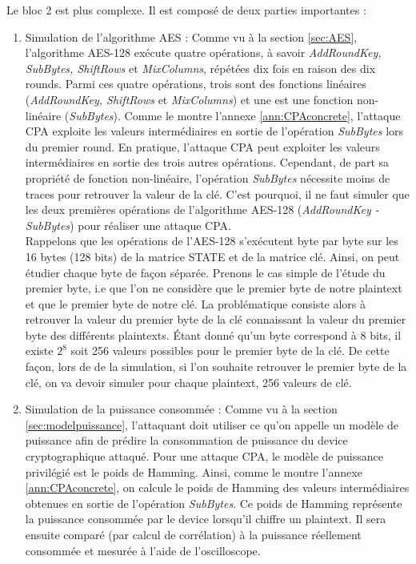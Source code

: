 \documentclass[oneside]{book}
\begin{document}
\hspace{-0.5 cm}Le bloc 2 est plus complexe. Il est composé de deux parties importantes :
\begin{enumerate}
\item Simulation de l'algorithme AES : Comme vu à la section \ref{sec:AES}, l'algorithme AES-128 exécute quatre opérations, à savoir \textit{AddRoundKey, SubBytes, ShiftRows} et \textit{MixColumns}, répétées dix fois en raison des dix rounds. Parmi ces quatre opérations, trois sont des fonctions linéaires (\textit{AddRoundKey, ShiftRows} et \textit{MixColumns}) et une est une fonction non-linéaire (\textit{SubBytes}). Comme le montre l'annexe \ref{ann:CPAconcrete}, l'attaque CPA exploite les valeurs intermédiaires en sortie de l'opération \textit{SubBytes} lors du premier round. En pratique, l'attaque CPA peut exploiter les valeurs intermédiaires en sortie des trois autres opérations. Cependant, de part sa propriété de fonction non-linéaire, l'opération \textit{SubBytes} nécessite moins de traces pour retrouver la valeur de la clé. C'est pourquoi, il ne faut simuler que les deux premières opérations de l'algorithme AES-128 (\textit{AddRoundKey - SubBytes}) pour réaliser une attaque CPA. \\Rappelons que les opérations de l'AES-128 s'exécutent byte par byte sur les 16 bytes (128 bits) de la matrice STATE et de la matrice clé. Ainsi, on peut étudier chaque byte de façon séparée. Prenons le cas simple de l'étude du premier byte, i.e que l'on ne considère que le premier byte de notre plaintext et que le premier byte de notre clé. La problématique consiste alors à retrouver la valeur du premier byte de la clé connaissant la valeur du premier byte des différents plaintexts. Étant donné qu'un byte correspond à 8 bits, il existe $2^8$ soit 256 valeurs possibles pour le premier byte de la clé. De cette façon, lors de de la simulation, si l'on souhaite retrouver le premier byte de la clé, on va devoir simuler pour chaque plaintext, 256 valeurs de clé.
\item Simulation de la puissance consommée : Comme vu à la section \ref{sec:modelpuissance}, l'attaquant doit utiliser ce qu'on appelle un modèle de puissance afin de prédire la consommation de puissance du device cryptographique attaqué. Pour une attaque CPA, le modèle de puissance privilégié est le poids de Hamming. Ainsi, comme le montre l'annexe \ref{ann:CPAconcrete}, on calcule le poids de Hamming des valeurs intermédiaires obtenues en sortie de l'opération \textit{SubBytes}. Ce poids de Hamming représente la puissance consommée par le device lorsqu'il chiffre un plaintext. Il sera ensuite comparé (par calcul de corrélation) à la puissance réellement consommée et mesurée à l'aide de l'oscilloscope. \\
\end{enumerate}
\end{document}
